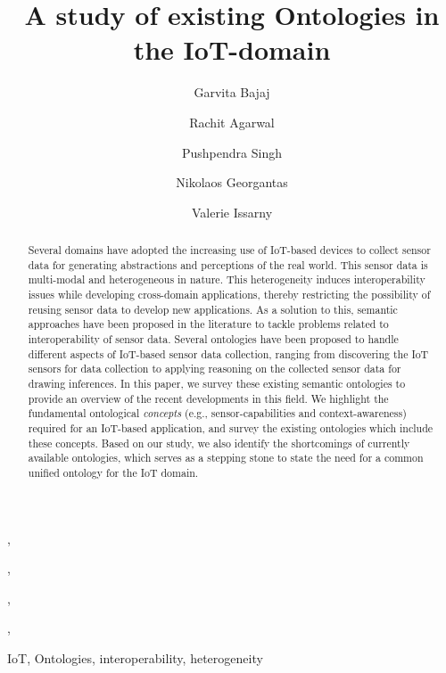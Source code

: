 \documentclass{elsart}  %
\begin{document}
\begin{frontmatter}

\title{A study of existing Ontologies in the IoT-domain}
\author[IIITdelhi]{Garvita Bajaj},
\author[inria]{Rachit Agarwal},
\author[IIITdelhi]{Pushpendra Singh},
\author[inria]{Nikolaos Georgantas},
\author[inria]{Valerie Issarny}

\address[IIITdelhi]{Indraprastha Institute of Information Technology, New Delhi, India}
\address[inria]{Inria, Paris, France}

\medskip

\begin{abstract}
Several domains have adopted the increasing use of IoT-based devices to collect sensor data for generating abstractions and perceptions of the real world. This sensor data is multi-modal and heterogeneous in nature. This heterogeneity induces interoperability issues while developing cross-domain applications, thereby restricting the possibility of reusing sensor data to develop new applications. As a solution to this, semantic approaches have been proposed in the literature to tackle problems related to interoperability of sensor data. Several ontologies have been proposed to handle different aspects of IoT-based sensor data collection, ranging from discovering the IoT sensors for data collection to applying reasoning on the collected sensor data for drawing inferences. In this paper, we survey these existing semantic ontologies to provide an overview of the recent developments in this field. We highlight the fundamental ontological \emph{concepts} (e.g., sensor-capabilities and context-awareness) required for an IoT-based application, and survey the existing ontologies which include these concepts. Based on our study, we also identify the shortcomings of currently available ontologies, which serves as a stepping stone to state the need for a common unified ontology for the IoT domain.
\end{abstract}
\begin{keyword}
IoT, Ontologies, interoperability, heterogeneity
\end{keyword}
\end{frontmatter}
\end{document}
